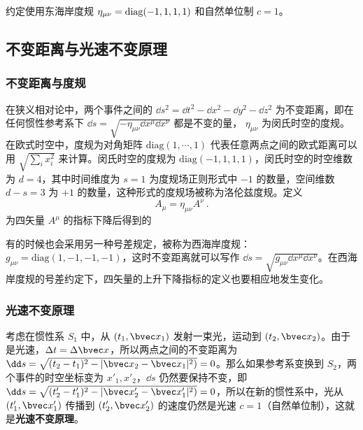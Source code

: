 

约定使用东海岸度规 $\eta_{\mu\nu}=\rm{diag}(-1,1,1,1)$ 和自然单位制 $c=1$。
\subsection{不变距离与光速不变原理}
\subsubsection{不变距离与度规}
在狭义相对论中，两个事件之间的 $\dd s^2=\dd t^2-\dd x^2-\dd y^2-\dd z^2$ 为不变距离，即在任何惯性参考系下 $\dd s=\sqrt{-\eta_{\mu\nu}\dd x^\mu \dd x^\nu}$ 都是不变的量， $\eta_{\mu\nu}$ 为闵氏时空的度规。 在欧式时空中，度规为对角矩阵 $\mathrm{diag}(1,\cdots,1)$ 代表任意两点之间的欧式距离可以用 $\sqrt{\sum_i x_i^2}$ 来计算。闵氏时空的度规为 $\mathrm{diag}(-1,1,1,1)$，闵氏时空的时空维数为 $d=4$，其中时间维度为 $s=1$ 为度规场正则形式中 $-1$ 的数量，空间维数 $d-s=3$ 为 $+1$ 的数量，这种形式的度规场被称为洛伦兹度规。定义
\begin{equation}
A_\mu = \eta_{\mu\nu}A^\nu~.
\end{equation}
为四矢量 $A^\mu$ 的指标下降后得到的

有的时候也会采用另一种号差规定，被称为西海岸度规： $g_{\mu\nu}=\mathrm{diag}(1,-1,-1,-1)$，这时不变距离就可以写作 $\dd s = \sqrt{g_{\mu\nu}\dd x^\mu \dd x^\nu}$。在西海岸度规的号差约定下，四矢量的上升下降指标的定义也要相应地发生变化。

\subsubsection{光速不变原理}

考虑在惯性系 $S_1$ 中，从 $(t_1,\bvec x_1)$ 发射一束光，运动到 $(t_2,\bvec x_2)$。由于是光速，$\Delta t=\Delta \bvec x$，所以两点之间的不变距离为 $\dd s=\sqrt{(t_2-t_1)^2-|\bvec x_2-\bvec x_1|^2)}=0$。那么如果参考系变换到 $S_2$，两个事件的时空坐标变为 $x'_1,x'_2$，$\dd s$ 仍然要保持不变，即 $\dd s=\sqrt{(t'_2-t'_1)^2-|\bvec x'_2-\bvec x'_1|^2)}=0$，所以在新的惯性系中，光从 $(t'_1,\bvec x'_1)$ 传播到 $(t'_2,\bvec x'_2)$ 的速度仍然是光速 $c=1$（自然单位制），这就是\textbf{光速不变原理}。
